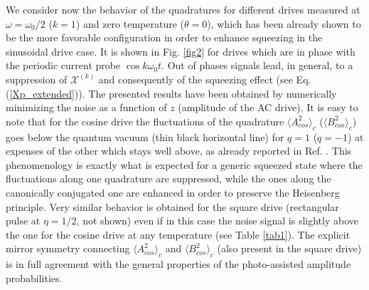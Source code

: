 \documentclass[twocolumn,showpacs,preprintnumbers,amsmath,amssymb%
 aps,
 prb,
 lengthcheck,%
]{revtex4-1}
\begin{document}
We consider now the behavior of the quadratures for different drives measured at $\omega=\omega_{0}/2$ ($k=1$) and zero temperature ($\theta=0$), which has been already shown to be the more favorable configuration in order to enhance squeezing in the sinusoidal drive case. \cite{grimsmo_quantum_2016} It is shown in Fig. \ref{fig2} for drives which are in phase with the periodic current probe $\cos{k\omega_{0}t}$. Out of phases signals lead, in general, to a suppression of $\mathcal{X}^{(k)}$ and consequently of the squeezing effect (see Eq. (\ref{Xp_extended})). The presented results have been obtained by numerically minimizing the noise as a function of $z$ (amplitude of the AC drive). It is easy to note that for the cosine drive the fluctuations of the quadrature $\langle A^{2}_{cos} \rangle_{c}$ ($\langle B^{2}_{cos} \rangle_{c}$) goes below the quantum vacuum (thin black horizontal line) for $q=1$ ($q=-1$) at expenses of the other which stays well above, as already reported in Ref. . This phenomenology is exactly what is expected for a generic squeezed state where the fluctuations along one quadrature are suppressed, while the ones along the canonically conjugated one are enhanced in order to preserve the Heisenberg principle. Very similar behavior is obtained for the square drive (rectangular pulse at $\eta=1/2$, not shown) even if in this case the noise signal is slightly above the one for the cosine drive at any temperature (see Table \ref{tab1}). The explicit mirror symmetry  connecting $\langle A^{2}_{cos} \rangle_{c}$ and $\langle B^{2}_{cos} \rangle_{c}$ (also present in the square drive) is in full agreement with the general properties of the photo-assisted amplitude probabilities. \cite{dubois_integer_2013} 
\end{document}
